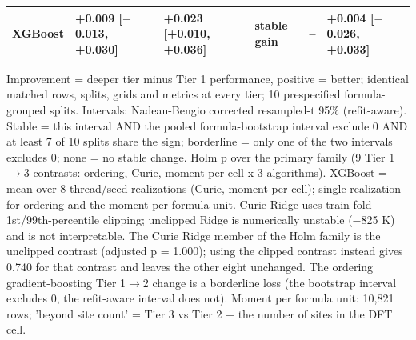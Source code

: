 \begin{table}
\begin{tabularx}{\textwidth}{@{}>{\raggedright\arraybackslash}Xlllrl@{}}
\quad XGBoost & +0.009 [$-$0.013, +0.030] & +0.023 [+0.010, +0.036] & stable gain & -- & +0.004 [$-$0.026, +0.033] \\
\bottomrule
\end{tabularx}
\par\vspace{4pt}\raggedright\noindent Improvement = deeper tier minus Tier 1 performance, positive = better; identical matched rows, splits, grids and metrics at every tier; 10 prespecified formula-grouped splits. Intervals: Nadeau-Bengio corrected resampled-t 95\% (refit-aware). Stable = this interval AND the pooled formula-bootstrap interval exclude 0 AND at least 7 of 10 splits share the sign; borderline = only one of the two intervals excludes 0; none = no stable change. Holm p over the primary family (9 Tier 1$\rightarrow$3 contrasts: ordering, Curie, moment per cell x 3 algorithms). XGBoost = mean over 8 thread/seed realizations (Curie, moment per cell); single realization for ordering and the moment per formula unit. Curie Ridge uses train-fold 1st/99th-percentile clipping; unclipped Ridge is numerically unstable ($-$825 K) and is not interpretable. The Curie Ridge member of the Holm family is the unclipped contrast (adjusted p = 1.000); using the clipped contrast instead gives 0.740 for that contrast and leaves the other eight unchanged. The ordering gradient-boosting Tier 1$\rightarrow$2 change is a borderline loss (the bootstrap interval excludes 0, the refit-aware interval does not). Moment per formula unit: 10,821 rows; 'beyond site count' = Tier 3 vs Tier 2 + the number of sites in the DFT cell.
\end{table}
